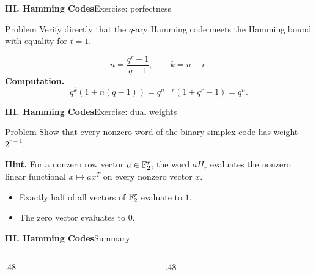 \begin{frame}{\textbf{III. Hamming Codes}}{Exercise: perfectness}
\small
\begin{block}{Problem}
Verify directly that the $q$-ary Hamming code meets the Hamming bound with equality for $t=1$.
\end{block}
\[
  n=\frac{q^r-1}{q-1},\qquad k=n-r.
\]
\textbf{Computation.}
\[
  q^k(1+n(q-1))=q^{n-r}(1+q^r-1)=q^n.
\]
\end{frame}

\begin{frame}{\textbf{III. Hamming Codes}}{Exercise: dual weights}
\small
\begin{block}{Problem}
Show that every nonzero word of the binary simplex code has weight $2^{r-1}$.
\end{block}
\textbf{Hint.}
For a nonzero row vector $a\in\mathbb{F}_2^r$, the word $aH_r$ evaluates the nonzero linear functional $x\mapsto ax^T$ on every nonzero vector $x$.
\begin{itemize}
  \item Exactly half of all vectors of $\mathbb{F}_2^r$ evaluate to $1$.
  \item The zero vector evaluates to $0$.
\end{itemize}
\end{frame}

\begin{frame}{\textbf{III. Hamming Codes}}{Summary}
\small
\begin{columns}[T,onlytextwidth]
  \begin{column}{.48\textwidth}
  \end{column}
  \begin{column}{.48\textwidth}
  \end{column}
\end{columns}
\end{frame}

